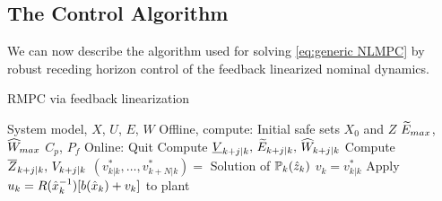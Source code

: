 \subsection{The Control Algorithm}
\label{sec:the control algo}
We can now describe the algorithm used for solving \eqref{eq:generic NLMPC} by robust receding horizon control of the feedback linearized nominal dynamics.

\begin{algorithm}
	\caption{RMPC via feedback linearization}
\begin{algorithmic}
	\Require System model, $X$, $U$, $E$, $W$ 
	\State	Offline, compute:
	\State \quad Initial safe sets $X_0$ and $Z$ 
	\State \quad $\widetilde{E}_{max}$, $\widehat{W}_{max}$ 
	\State \quad $C_p$, $P_f$ 
	\State Online: 
	\State Quit
	\Else
	\State Compute $\underline{V}_{k+j|k},\,\widetilde{E}_{k+j|k},\, \widehat{W}_{k+j|k}$ 
	\State Compute $\overline{Z}_{k+j|k},\,V_{k+j|k}$ 
	\State $(v^*_{k|k}, \ldots, v^*_{k+N|k}) = $ Solution of $\mathbb{P}_{k}(\hat{z}_{k})$ 
	\State $v_k = v^{*}_{k|k}$
	\State Apply $u_k = R(\hat{x}_{k}^{-1})[b(\hat{x}_{k})+v_k]$ to plant 
	\EndFor	
	\EndIf		
\end{algorithmic}
\label{alg:RMPC}
\end{algorithm}

